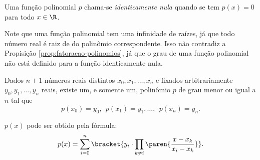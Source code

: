 \begin{definition}
Uma função polinomial $p$ chama-se \emph{identicamente nula} quando
se tem $p(x) = 0$ para todo $x \in \R$.
\end{definition}

\begin{remark}
Note que uma função polinomial tem uma infinidade de raízes, 
já que todo número real é raiz de do polinômio correspondente. 
Isso não contradiz a Propisição \ref{prop:fatoracao-polinomios}, 
já que o grau de uma função polinomial não está definido para a função identicamente nula.
\end{remark}

\begin{proposition}
Dados $n+1$ números reais distintos $x_0, x_1 , \dots , x_n$ e
fixados arbitrariamente $y_0, y_1, \dots, y_n$ reais, existe
um, e somente um, polinômio $p$ de grau menor ou igual a $n$ tal que
$$p(x_0) = y_0, \ \ p(x_1) = y_1,  \dots , \ \ p(x_n) = y_n.$$

$p(x)$ pode ser obtido pela fórmula:
$$p(x) = \sum_{i=0}^{n} \bracket{y_i \cdot \prod_{k \neq i} \paren{\frac {x-
x_k}{x_i-x_k}}}.$$
\end{proposition}